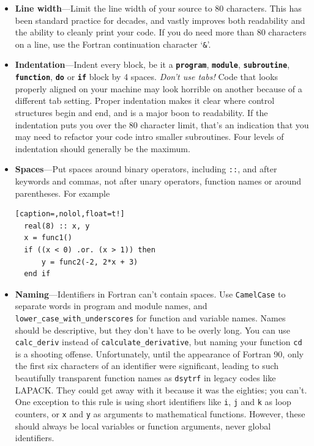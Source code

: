 \documentclass[openany,oneside]{report}
\newcommand{\keyword}[1]{\texttt{\bfseries\color{DarkBlue}#1}}
\begin{document}
\begin{itemize}
  \item\textbf{Line width}---Limit the line width of your source to 80 characters.
    This has been standard practice for decades, and vastly improves both readability and the ability to cleanly print your code.
    If you do need more than 80 characters on a line, use the Fortran continuation character `\texttt{\&}'.
  \item\textbf{Indentation}---Indent every block, be it  a \keyword{program}, \keyword{module}, \keyword{subroutine}, \keyword{function}, \keyword{do} or \keyword{if} block by 4 spaces.
    \emph{Don't use tabs!} Code that looks properly aligned on your machine may look horrible on another because of a different tab setting.
    Proper indentation makes it clear where control structures begin and end, and is a major boon to readability.
    If the indentation puts you over the 80 character limit, that's an indication that you may need to refactor your code intro smaller subroutines.
    Four levels of indentation should generally be the maximum.
  \item\textbf{Spaces}---Put spaces around binary operators, including \texttt{::}, and after keywords and commas, not after unary operators, function names or around parentheses. For example\newpage
\begin{lstlisting}[caption=,nolol,float=t!]
  real(8) :: x, y
  x = func1()
  if ((x < 0) .or. (x > 1)) then
      y = func2(-2, 2*x + 3)
  end if
\end{lstlisting}
  \item\textbf{Naming}---Identifiers in Fortran can't contain spaces.
    Use \texttt{CamelCase} to separate words in program and module names, and \texttt{lower\_case\_with\_underscores} for function and variable names.
    Names should be descriptive, but they don't have to be overly long.
    You can use \texttt{calc\_deriv} instead of \texttt{calculate\_derivative}, but naming your function \texttt{cd} is a shooting offense.
    Unfortunately, until the appearance of Fortran 90, only the first six characters of an identifier were significant, leading to such beautifully transparent function names as \texttt{dsytrf} in legacy codes like LAPACK.
    They could get away with it because it was the eighties; you can't.
    One exception to this rule is using short identifiers like \texttt{i}, \texttt{j} and \texttt{k} as loop counters, or \texttt{x} and \texttt{y} as arguments to mathematical functions.
    However, these should always be local variables or function arguments, never global identifiers.

\end{itemize}
\end{document}
